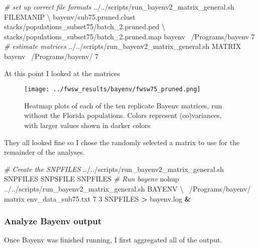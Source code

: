 \documentclass[11pt,]{article}
\newenvironment{Shaded}{\begin{snugshade}}{\end{snugshade}}
\newcommand{\KeywordTok}[1]{\textcolor[rgb]{0.13,0.29,0.53}{\textbf{#1}}}
\newcommand{\CommentTok}[1]{\textcolor[rgb]{0.56,0.35,0.01}{\textit{#1}}}
\newcommand{\FunctionTok}[1]{\textcolor[rgb]{0.00,0.00,0.00}{#1}}
\newcommand{\OperatorTok}[1]{\textcolor[rgb]{0.81,0.36,0.00}{\textbf{#1}}}
\newcommand{\ExtensionTok}[1]{#1}
\newcommand{\NormalTok}[1]{#1}
\begin{document}
\begin{Shaded}
\begin{Highlighting}[]
\CommentTok{# set up correct file formats}
\ExtensionTok{../../scripts/run_bayenv2_matrix_general.sh}\NormalTok{ FILEMANIP \textbackslash{}}
\NormalTok{bayenv/sub75.pruned.clust stacks/populations_subset75/batch_2.pruned.ped \textbackslash{}}
\NormalTok{stacks/populations_subset75/batch_2.pruned.map bayenv ~/Programs/bayenv 7}
\CommentTok{# estimate matrices}
\ExtensionTok{../../scripts/run_bayenv2_matrix_general.sh}\NormalTok{ MATRIX bayenv ~/Programs/bayenv/ 7}
\end{Highlighting}
\end{Shaded}

At this point I looked at the matrices

\begin{figure}
\centering
\texttt{[image: ../fwsw\_results/bayenv/fwsw75\_pruned.png]}
\caption{Heatmap plots of each of the ten replicate Bayenv matrices, run
without the Florida populations. Colors represent (co)variances, with
larger values shown in darker colors}
\end{figure}

They all looked fine so I chose the randomly selected a matrix to use
for the remainder of the analyses.

\begin{Shaded}
\begin{Highlighting}[]
\CommentTok{# Create the SNPFILES}
\ExtensionTok{../../scripts/run_bayenv2_matrix_general.sh}\NormalTok{ SNPFILES SNPSFILE SNPFILES}
\CommentTok{# Run bayenv}
\FunctionTok{nohup}\NormalTok{ ../../scripts/run_bayenv2_matrix_general.sh BAYENV \textbackslash{}}
\NormalTok{~/Programs/bayenv/ matrix env_data_sub75.txt 7 3 SNPFILES }\OperatorTok{>}\NormalTok{ bayenv.log }\KeywordTok{&}
\end{Highlighting}
\end{Shaded}

\subsubsection{Analyze Bayenv output}\label{analyze-bayenv-output}

Once Bayenv was finished running, I first aggregated all of the output.
\end{document}
